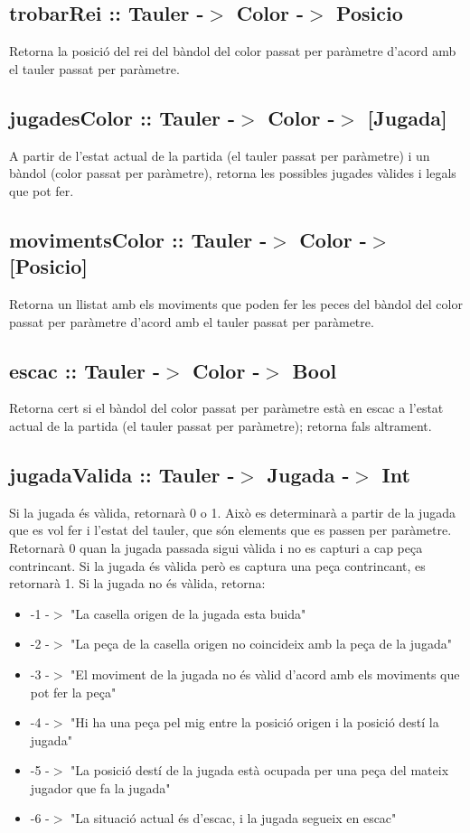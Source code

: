 \documentclass{article}
\begin{document}
\subsection*{trobarRei :: Tauler -$>$ Color -$>$ Posicio}
Retorna la posició del rei del bàndol del color passat per paràmetre
d'acord amb el tauler passat per paràmetre.
\subsection*{jugadesColor :: Tauler -$>$ Color -$>$ [Jugada]}
A partir de l'estat actual de la partida (el tauler passat per paràmetre)
i un bàndol (color passat per paràmetre), retorna les possibles jugades
vàlides i legals que pot fer.
\subsection*{movimentsColor :: Tauler -$>$ Color -$>$ [Posicio]}
Retorna un llistat amb els moviments que poden fer les peces del
bàndol del color passat per paràmetre d'acord amb el tauler passat
per paràmetre.
\subsection*{escac :: Tauler -$>$ Color -$>$ Bool}
Retorna cert si el bàndol del color passat per paràmetre està en escac
a l'estat actual de la partida (el tauler passat per paràmetre); retorna
fals altrament.
\subsection*{jugadaValida :: Tauler -$>$ Jugada -$>$ Int}
Si la jugada és vàlida, retornarà 0 o 1. Això es determinarà a partir de
la jugada que es vol fer i l'estat del tauler, que són elements que es passen
per paràmetre. Retornarà 0 quan la jugada passada sigui vàlida i no es capturi
a cap peça contrincant. Si la jugada és vàlida però es captura una peça contrincant,
es retornarà 1. Si la jugada no és vàlida, retorna:
\begin{itemize}
 \item-1 -$>$ "La casella origen de la jugada esta buida"
 \item-2 -$>$ "La peça de la casella origen no coincideix amb la peça de la jugada"
 \item-3 -$>$ "El moviment de la jugada no és vàlid d'acord amb els moviments que pot fer la peça"
  \item-4 -$>$ "Hi ha una peça pel mig entre la posició origen i la posició destí la jugada"
 \item-5 -$>$ "La posició destí de la jugada està ocupada per una peça del mateix jugador que fa la jugada"
   \item-6 -$>$ "La situació actual és d'escac, i la jugada segueix en escac"
\end{itemize}
\end{document}
